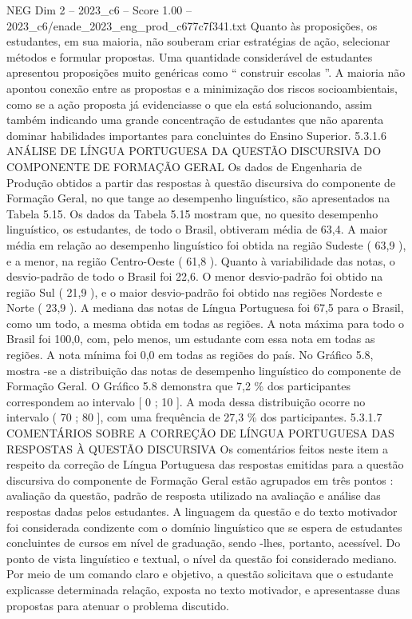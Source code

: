 \begin{textsample}{NEG Dim 2 – 2023\_c6 – Score 1.00 – 2023\_c6/enade\_2023\_eng\_prod\_c677c7f341.txt}
Quanto às proposições, os estudantes, em sua maioria, não souberam criar estratégias de ação, selecionar métodos e formular propostas.
Uma quantidade considerável de estudantes apresentou proposições muito genéricas como “ construir escolas ”.
A maioria não apontou conexão entre as propostas e a minimização dos riscos socioambientais, como se a ação proposta já evidenciasse o que ela está solucionando, assim também indicando uma grande concentração de estudantes que não aparenta dominar habilidades importantes para concluintes do Ensino Superior. 5.3.1.6 ANÁLISE DE LÍNGUA PORTUGUESA DA QUESTÃO DISCURSIVA DO COMPONENTE DE FORMAÇÃO GERAL Os dados de Engenharia de Produção obtidos a partir das respostas à questão discursiva do componente de Formação Geral, no que tange ao desempenho linguístico, são apresentados na Tabela 5.15.
Os dados da Tabela 5.15 mostram que, no quesito desempenho linguístico, os estudantes, de todo o Brasil, obtiveram média de 63,4.
A maior média em relação ao desempenho linguístico foi obtida na região Sudeste ( 63,9 ), e a menor, na região Centro-Oeste ( 61,8 ).
Quanto à variabilidade das notas, o desvio-padrão de todo o Brasil foi 22,6.
O menor desvio-padrão foi obtido na região Sul ( 21,9 ), e o maior desvio-padrão foi obtido nas regiões Nordeste e Norte ( 23,9 ).
A mediana das notas de Língua Portuguesa foi 67,5 para o Brasil, como um todo, a mesma obtida em todas as regiões.
A nota máxima para todo o Brasil foi 100,0, com, pelo menos, um estudante com essa nota em todas as regiões.
A nota mínima foi 0,0 em todas as regiões do país.
No Gráfico 5.8, mostra -se a distribuição das notas de desempenho linguístico do componente de Formação Geral.
O Gráfico 5.8 demonstra que 7,2 \% dos participantes correspondem ao intervalo [ 0 ; 10 ].
A moda dessa distribuição ocorre no intervalo ( 70 ; 80 ], com uma frequência de 27,3 \% dos participantes. 5.3.1.7 COMENTÁRIOS SOBRE A CORREÇÃO DE LÍNGUA PORTUGUESA DAS RESPOSTAS À QUESTÃO DISCURSIVA Os comentários feitos neste item a respeito da correção de Língua Portuguesa das respostas emitidas para a questão discursiva do componente de Formação Geral estão agrupados em três pontos : avaliação da questão, padrão de resposta utilizado na avaliação e análise das respostas dadas pelos estudantes.
A linguagem da questão e do texto motivador foi considerada condizente com o domínio linguístico que se espera de estudantes concluintes de cursos em nível de graduação, sendo -lhes, portanto, acessível.
Do ponto de vista linguístico e textual, o nível da questão foi considerado mediano.
Por meio de um comando claro e objetivo, a questão solicitava que o estudante explicasse determinada relação, exposta no texto motivador, e apresentasse duas propostas para atenuar o problema discutido.

\end{textsample}
